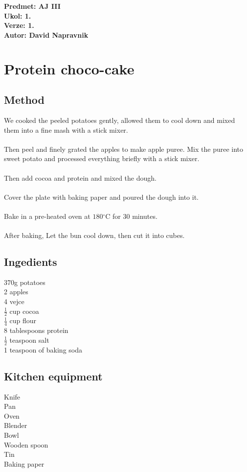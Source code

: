 \documentclass[a4paper]{article}
\begin{document}
\noindent
\textbf{Predmet: AJ III}\\
\textbf{Ukol: 1.}\\
\textbf{Verze: 1.}\\
\textbf{Autor: David Napravnik}

\section*{Protein choco-cake}

\subsection*{Method}
We cooked the peeled potatoes gently, allowed them to cool down and mixed
them into a fine mash with a stick mixer.
\\\\
Then peel and finely grated the apples to make apple puree. Mix the
puree into sweet potato and processed everything briefly with a stick mixer.
\\\\
Then add cocoa and protein and mixed the dough.
\\\\
Cover the plate with baking paper and poured the dough into it.
\\\\
Bake in a pre-heated oven at $180{}^\circ$C for 30 minutes.
\\\\
After baking, Let the bun cool down, then cut it into cubes.


\begin{multicols}{2}
	\subsection*{Ingedients}
	370g potatoes\\
	2 apples\\
	4 vejce\\
	$\frac{1}{2}$ cup cocoa\\
	$\frac{1}{4}$ cup flour\\
	8 tablespoons protein\\
	$\frac{1}{2}$ teaspoon salt\\
	1 teaspoon of baking soda
	
	

	\subsection*{Kitchen equipment}
	Knife\\
	Pan\\
	Oven\\
	Blender\\
	Bowl\\
	Wooden spoon\\
	Tin\\
	Baking paper

	
		
\end{multicols}
\end{document}
